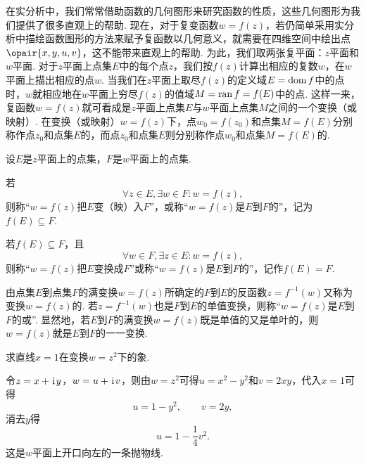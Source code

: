 在实分析中，我们常常借助函数的几何图形来研究函数的性质，这些几何图形为我们提供了很多直观上的帮助.
现在，对于复变函数\(w = f(z)\)，若仍简单采用实分析中描绘函数图形的方法来赋予复函数以几何意义，就需要在四维空间中绘出点\(\opair{x,y,u,v}\)，这不能带来直观上的帮助.
为此，我们取两张复平面：\(z\)平面和\(w\)平面.
对于\(z\)平面上点集\(E\)中的每个点\(z\)，我们按\(f(z)\)计算出相应的复数\(w\)，在\(w\)平面上描出相应的点\(w\).
当我们在\(z\)平面上取尽\(f(z)\)的定义域\(E = \operatorname{dom} f\)中的点时，\(w\)就相应地在\(w\)平面上穷尽\(f(z)\)的值域\(M = \operatorname{ran} f = f(E)\)中的点.
这样一来，复函数\(w = f(z)\)就可看成是\(z\)平面上点集\(E\)与\(w\)平面上点集\(M\)之间的一个变换（或映射）.
在变换（或映射）\(w=f(z)\)下，点\(w_0=f(z_0)\)和点集\(M=f(E)\)分别称作点\(z_0\)和点集\(E\)的，而点\(z_0\)和点集\(E\)则分别称作点\(w_0\)和点集\(M=f(E)\)的.

\begin{definition}
设\(E\)是\(z\)平面上的点集，\(F\)是\(w\)平面上的点集.

若\[
\forall z \in E, \exists w \in F : w = f(z),
\]则称“\(w=f(z)\)把\(E\)变（映）入\(F\)”，或称“\(w=f(z)\)是\(E\)到\(F\)的”，记为\(f(E) \subseteq F\).

若\(f(E) \subseteq F\)，且\[
\forall w \in F, \exists z \in E : w = f(z),
\]则称“\(w = f(z)\)把\(E\)变换成\(F\)”或称“\(w = f(z)\)是\(E\)到\(F\)的”，记作\(f(E) = F\).

由点集\(E\)到点集\(F\)的满变换\(w = f(z)\)所确定的\(F\)到\(E\)的反函数\(z=f^{-1}(w)\)又称为变换\(w = f(z)\)的.
若\(z=f^{-1}(w)\)也是\(F\)到\(E\)的单值变换，则称“\(w = f(z)\)是\(E\)到\(F\)的或”.
显然地，若\(E\)到\(F\)的满变换\(w = f(z)\)既是单值的又是单叶的，则\(w = f(z)\)就是\(E\)到\(F\)的一一变换.
\end{definition}

\begin{example}
求直线\(x=1\)在变换\(w=z^2\)下的象.
\begin{solution}
令\(z=x+\kern1pt\mathrm{i}\kern1pt y\)，\(w=u+\kern1pt\mathrm{i}\kern1pt v\)，则由\(w=z^2\)可得\(u=x^2-y^2\)和\(v=2xy\)，代入\(x=1\)可得\[
u=1-y^2, \qquad v=2y,
\]消去\(y\)得\[
u=1-\frac{1}{4} v^2.
\]这是\(w\)平面上开口向左的一条抛物线.
\end{solution}
\end{example}

